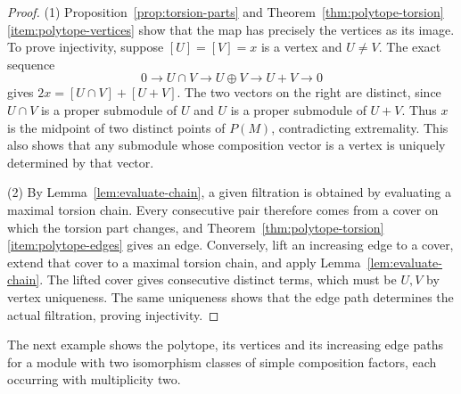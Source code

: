 \documentclass[a4paper,reqno,10pt]{amsart}
\theoremstyle{definition}
\numberwithin{equation}{section}
\begin{document}
\begin{proof}
(1) Proposition~\ref{prop:torsion-parts} and
Theorem~\ref{thm:polytope-torsion}\ref{item:polytope-vertices} show
that the map has precisely the vertices as its image. To prove
injectivity, suppose $[U]=[V]=x$ is a vertex and $U\ne V$.
The exact sequence
\[
 0\longrightarrow U\cap V\longrightarrow U\oplus V
   \longrightarrow U+V\longrightarrow0
\]
gives $2x=[U\cap V]+[U+V]$. The two vectors on the right are distinct,
since $U\cap V$ is a proper submodule of $U$ and $U$ is a proper
submodule of $U+V$. Thus $x$ is the midpoint of two distinct points
of $P(M)$, contradicting extremality. This also shows that any submodule
whose composition vector is a vertex is uniquely determined by that vector.

(2) By Lemma~\ref{lem:evaluate-chain}, a given filtration is obtained
by evaluating a maximal torsion chain. Every consecutive pair
therefore comes from a cover on which the torsion part changes, and
Theorem~\ref{thm:polytope-torsion}\ref{item:polytope-edges} gives an edge.
Conversely, lift an increasing edge to a cover, extend that cover to a
maximal torsion chain, and apply Lemma~\ref{lem:evaluate-chain}.
The lifted cover gives
consecutive distinct terms, which must be $U,V$ by vertex uniqueness.
The same uniqueness shows that the edge path determines the actual
filtration, proving injectivity.
\end{proof}

The next example shows the polytope, its vertices and its increasing
edge paths for a module with two isomorphism classes of simple
composition factors, each occurring with multiplicity two.
\end{document}
